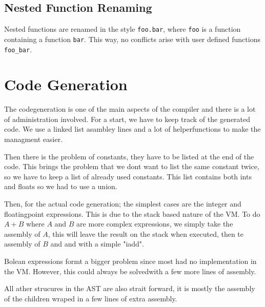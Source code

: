 \documentclass[a4paper,11pt]{report}
\begin{document}
\subsection{Nested Function Renaming}
Nested functions are renamed in the style \texttt{foo.bar}, where \texttt{foo} is a function containing a function \texttt{bar}. This way, no conflicts arise with user defined functions \texttt{foo\_bar}.

\section{Code Generation}
The codegeneration is one of the main aspects of the compiler and there is a lot of administration involved.
For a start, we have to keep track of the generated code.
We use a linked list asambley lines and a lot of helperfunctions to make the managment easier.

Then there is the problem of constants, they have to be listed at the end of the code.
This brings the problem that we dont want to list the same constant twice, so we have to keep a list of already used constants.
This list contains both ints and floats so we had to use a union.
 
Then, for the actual code generation; the simplest cases are the integer and floatingpoint expressions.
This is due to the stack based nature of the VM. To do $A+B$ where $A$ and $B$ are more complex expressions, we simply take the assembly of $A$, this will leave the result on the stack when executed, then te assembly of $B$ and and with a simple "iadd".

Bolean expressions formt a bigger problem since most had no implementation in the VM. However, this could always be solvedwith a few more lines of assembly.

All ather strucures in the AST are also strait forward, it is mostly the assembly of the children wraped in a few lines of extra assembly.
\end{document}
